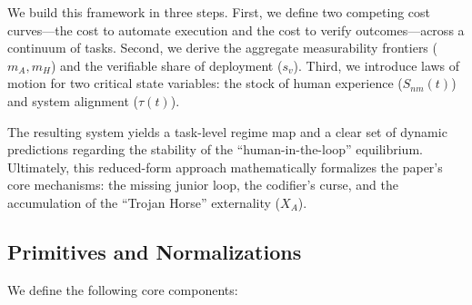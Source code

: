 \documentclass[12pt, letter]{article}
\begin{document}
We build this framework in three steps. First, we define two competing cost curves—the cost to automate execution and the cost to verify outcomes—across a continuum of tasks. Second, we derive the aggregate measurability frontiers ($m_A, m_H$) and the verifiable share of deployment ($s_v$). Third, we introduce laws of motion for two critical state variables: the stock of human experience ($S_{nm}(t)$) and system alignment ($\tau(t)$).

The resulting system yields a task-level regime map and a clear set of dynamic predictions regarding the stability of the ``human-in-the-loop'' equilibrium. Ultimately, this reduced-form approach mathematically formalizes the paper's core mechanisms: the missing junior loop, the codifier’s curse, and the accumulation of the ``Trojan Horse'' externality ($X_A$).


\subsection{Primitives and Normalizations}\label{subsec:core-primitives}

We define the following core components:
\end{document}
